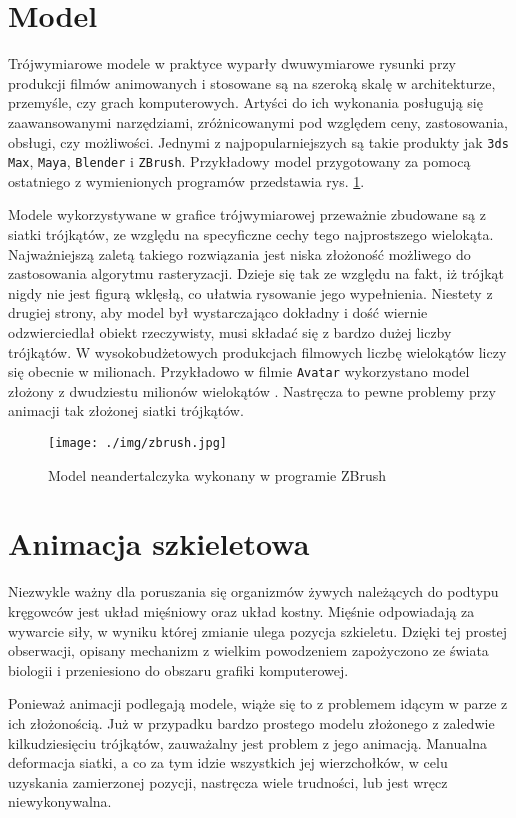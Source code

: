\documentclass[11pt]{mwrep}
\begin{document}
  \section{Model}
Trójwymiarowe modele w praktyce wyparły dwuwymiarowe rysunki przy produkcji filmów animowanych i stosowane są na szeroką skalę w architekturze, przemyśle, czy grach komputerowych. Artyści do ich wykonania posługują się zaawansowanymi narzędziami, zróżnicowanymi pod względem ceny, zastosowania, obsługi, czy możliwości. Jednymi z najpopularniejszych są takie produkty jak \texttt{3ds Max}, \texttt{Maya}, \texttt{Blender} i \texttt{ZBrush}. Przykładowy model przygotowany za pomocą ostatniego z wymienionych programów przedstawia rys. \ref{img:zbrush}.

Modele wykorzystywane w grafice trójwymiarowej przeważnie zbudowane są z siatki trójkątów, ze względu na specyficzne cechy tego najprostszego wielokąta. Najważniejszą zaletą takiego rozwiązania jest niska złożoność możliwego do zastosowania algorytmu rasteryzacji. Dzieje się tak ze względu na fakt, iż trójkąt nigdy nie jest figurą wklęsłą, co ułatwia rysowanie jego wypełnienia. Niestety z drugiej strony, aby model był wystarczająco dokładny i dość wiernie odzwierciedlał obiekt rzeczywisty, musi składać się z bardzo dużej liczby trójkątów. W wysokobudżetowych produkcjach filmowych liczbę wielokątów liczy się obecnie w milionach. Przykładowo w filmie \texttt{Avatar} wykorzystano model złożony z dwudziestu milionów wielokątów \cite{avatar}. Nastręcza to pewne problemy przy animacji tak złożonej siatki trójkątów.

    \begin{figure}
  \centering
    \texttt{[image: ./img/zbrush.jpg]}
  \caption{Model neandertalczyka wykonany w programie ZBrush \cite{zbrush}}
  \label{img:zbrush}
  \end{figure}
  \section{Animacja szkieletowa}

Niezwykle ważny dla poruszania się organizmów żywych należących do podtypu kręgowców jest układ mięśniowy oraz układ kostny. Mięśnie odpowiadają za wywarcie siły, w wyniku której zmianie ulega pozycja szkieletu. Dzięki tej prostej obserwacji, opisany mechanizm z wielkim powodzeniem zapożyczono ze świata biologii i przeniesiono do obszaru grafiki komputerowej.

Ponieważ animacji podlegają modele, wiąże się to z problemem idącym w parze z ich złożonością. Już w przypadku bardzo prostego modelu złożonego z zaledwie kilkudziesięciu trójkątów, zauważalny jest problem z jego animacją. Manualna deformacja siatki, a co za tym idzie wszystkich jej wierzchołków, w celu uzyskania zamierzonej pozycji, nastręcza wiele trudności, lub jest wręcz niewykonywalna.
\end{document}
